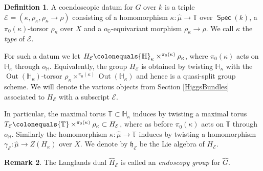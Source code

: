 \documentclass{article}
\DeclareMathOperator{\Spec}{\mathsf{Spec}}
\newcommand{\BG}{{\mathbb{G}}}
\newcommand{\BH}{{\mathbb{H}}}
\newcommand{\BT}{{\mathbb{T}}}
\newcommand{\CE}{{\mathcal E}}
\DeclareMathOperator{\Out}{Out}
\newcommand{\defeq}{\colonequals}
\theoremstyle{definition}
\newtheorem{definition}{Definition}[section]
\newtheorem{rmk}[definition]{Remark}
\theoremstyle{plain}
\begin{document}
\begin{definition} \label{DEDef1}
A coendoscopic datum for $G$ over $k$ is a triple $\CE=(\kappa,\rho_\kappa,\rho_\kappa \to \rho)$ consisting of a homomorphism $\kappa \colon \hat\mu \to \BT$ over $\Spec(k)$, a $\pi_0(\kappa)$-torsor $\rho_\kappa$ over $X$ and a $o_\BG$-equivariant morphism $\rho_\kappa \to \rho$. We call $\kappa$ the \emph{type} of $\CE$.

For such a datum we let $H_\CE \defeq \BH_\kappa \times^{\pi_0(\kappa)} \rho_\kappa$, where $\pi_0(\kappa)$ acts on $\BH_\kappa$ through $o_\BH$. Equivalently, the group $H_\CE$ is obtained by twisting $\BH_\kappa$ with the $\Out(\BH_\kappa)$-torsor $\rho_\kappa \times^{\pi_0(\kappa)} \Out(\BH_\kappa)$ and hence is a quasi-split group scheme. We will denote the various objects from Section \ref{HiggsBundles} associated to $H_\CE$ with a subscript $\CE$.

 In particular, the maximal torus $\BT \subset \BH_\kappa$ induces by twisting a maximal torus $T_\CE \defeq \BT \times^{\pi_0(\kappa)} \rho_\kappa \subset H_\CE$, where as before $\pi_0(\kappa)$ acts on $\BT$ through $o_\BH$. Similarly the homomorphism $\kappa\colon \hat \mu \to \BT$ induces by twisting a homomorphism $\gamma_\CE \colon \hat\mu \to Z(H_\kappa)$ over $X$. We denote by $\mathfrak{h}_\CE$ be the Lie algebra of $H_\CE$.
\end{definition}

\begin{rmk}
The Langlands dual $\widehat{H}_{\CE}$ is called an \emph{endoscopy group} for $\widehat{G}$.
\end{rmk}
\end{document}
